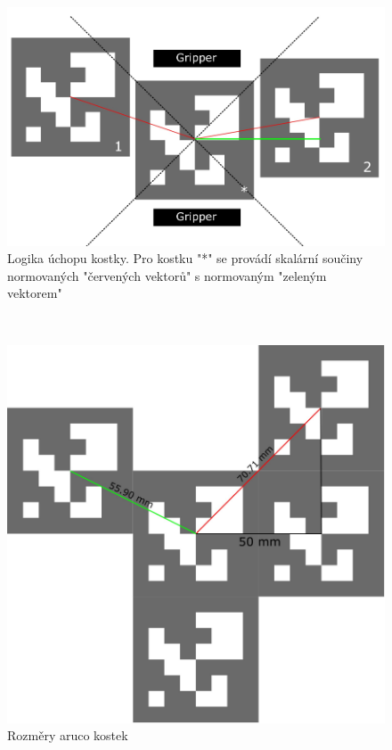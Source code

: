 \documentclass[journal,twoside,web]{ieeecolor}
\begin{document}
        \begin{figure}[h!]
            \centering
            \hypertarget{scalar_logic}{}
            \includegraphics[width=\linewidth]{images/scalar}
            \caption{Logika úchopu kostky. Pro kostku "*" se provádí skalární součiny normovaných "červených vektorů"
                    s normovaným "zeleným vektorem"}
            \label{fig:scalar_logic}
        \end{figure}\\

        \begin{figure}[h!]
            \centering
            \hypertarget{aruco_geometry}{}
            \includegraphics[width=0.8\linewidth]{aruco_geometry_cropped}
            \caption{Rozměry aruco kostek}
            \label{fig:aruco_geometry}
        \end{figure}
\end{document}
